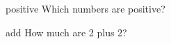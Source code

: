 \documentclass{article}
\begin{document}

\begin{examcopy}
  \begin{questionmult}{positive}
    Which numbers are positive?
    \begin{choices}
      \correctchoice{$\pi$}
    \end{choices}
  \end{questionmult}

  \begin{questionmultx}{add}
    How much are 2 plus 2?
  \end{questionmultx}
\end{examcopy}
\end{document}
